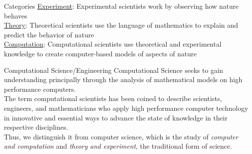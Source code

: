 \documentclass[xcolor=x11names,compress, handout]{beamer}
\renewcommand{\(}{\begin{columns}}
\renewcommand{\)}{\end{columns}}
\newcommand{\<}[1]{\begin{column}{#1}}
\renewcommand{\>}{\end{column}}
\begin{document}
\begin{frame}{Categories}
\underline{Experiment}: Experimental scientists work by \alert{observing how} nature behaves\\
\vspace*{0.25 in}
\underline{Theory}: Theoretical scientists use the language of mathematics to \alert{explain and predict} the behavior of nature\\
\vspace*{0.25 in}
\underline{Computation}: Computational scientists use theoretical and experimental knowledge to \alert{create computer-based models} of aspects of nature
\end{frame}

\begin{frame}{Computational Science/Engineering}
\textcolor{dgreen}{Computational Science} seeks to gain understanding principally through the analysis of mathematical models on high performance computers.\\
\vspace*{0.25 in}
The term \textcolor{dgreen}{computational scientists} has been coined to describe scientists, engineers, and mathematicians who apply high performance computer technology in innovative and essential ways to advance the state of knowledge in their respective disciplines.\\
\vspace*{0.25 in}
Thus, we distinguish it from \textcolor{dgreen}{computer science}, which is the study of \emph{computer and computation} and \emph{theory and experiment}, the traditional form of science. 
\end{frame}

\end{document}
